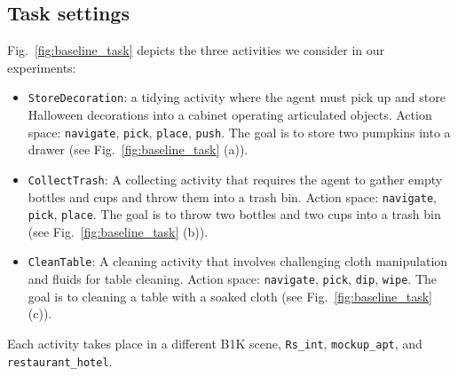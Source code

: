 \subsection{Task settings}
Fig.~\ref{fig:baseline_task} depicts the three activities we consider in our experiments: 
\vspace{-2mm}
\begin{itemize}[leftmargin=2em]
    \item \texttt{StoreDecoration}: a tidying activity where the agent must pick up and store Halloween decorations into a cabinet operating articulated objects. Action space: \texttt{navigate}, \texttt{pick}, \texttt{place}, \texttt{push}. The goal is to store two pumpkins into a drawer (see Fig.~\ref{fig:baseline_task} (a)).
    \item \texttt{CollectTrash}: A collecting activity that requires the agent to gather empty bottles and cups and throw them into a trash bin. Action space: \texttt{navigate}, \texttt{pick}, \texttt{place}. The goal is to throw two bottles and two cups into a trash bin (see Fig.~\ref{fig:baseline_task} (b)).
    \item \texttt{CleanTable}: A cleaning activity that involves challenging cloth manipulation and fluids for table cleaning. Action space: \texttt{navigate}, \texttt{pick}, \texttt{dip}, \texttt{wipe}. The goal is to cleaning a table with a soaked cloth (see Fig.~\ref{fig:baseline_task} (c)). 
\end{itemize}
Each activity takes place in a different B1K scene, \texttt{Rs\_int}, \texttt{mockup\_apt}, and \texttt{restaurant\_hotel}. 

